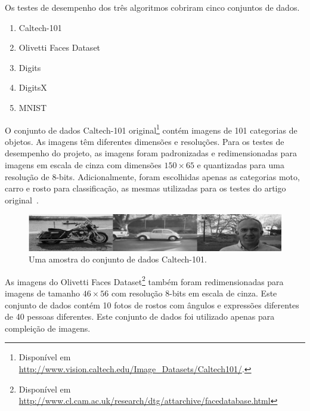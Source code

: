 \documentclass[12pt]{article}
\theoremstyle{plain}
\numberwithin{equation}{section}
\begin{document}
Os testes de desempenho dos três algoritmos cobriram cinco conjuntos de dados.

\begin{enumerate}[label=\,(\alph*)]
  \item Caltech-101~\cite{caltech101}
  \item Olivetti Faces Dataset~\cite{olivetti}
  \item Digits~\cite{digits}
  \item DigitsX~\cite{digitsx}
  \item MNIST~\cite{mnist}
\end{enumerate}

O conjunto de dados Caltech-101 original\footnote{Disponível em
  \url{http://www.vision.caltech.edu/Image_Datasets/Caltech101/}.} contém imagens de 101 categorias
de objetos. As imagens têm diferentes dimensões e resoluções. Para os testes de desempenho do
projeto, as imagens foram padronizadas e redimensionadas para imagens em escala de cinza com
dimensões $150\times 65$ e quantizadas para uma resolução de 8-bits.  Adicionalmente, foram
escolhidas apenas as categorias moto, carro e rosto para classificação, as mesmas utilizadas para
os testes do artigo original~\cite{poon-domingos}.

\begin{figure}[h]
  \centering\includegraphics[scale=1.0]{imgs/caltech_sample.png}
  \caption{Uma amostra do conjunto de dados Caltech-101.}
\end{figure}

As imagens do Olivetti Faces Dataset\footnote{Disponível em
  \url{http://www.cl.cam.ac.uk/research/dtg/attarchive/facedatabase.html}} também foram
redimensionadas para imagens de tamanho $46\times 56$ com resolução 8-bits em escala de cinza. Este
conjunto de dados contém 10 fotos de rostos com ângulos e expressões diferentes de 40 pessoas
diferentes. Este conjunto de dados foi utilizado apenas para compleição de imagens.
\end{document}
